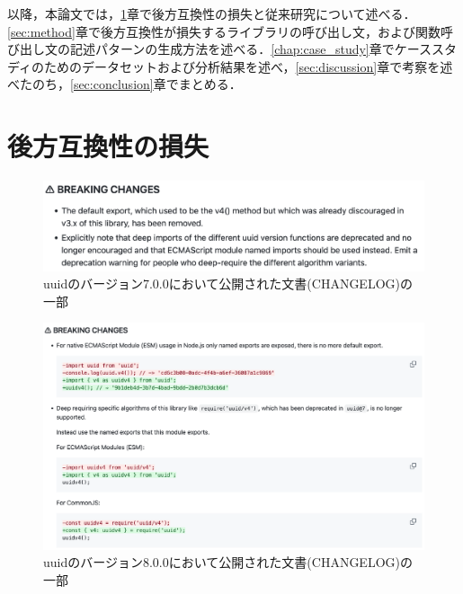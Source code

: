 \documentclass[11pt]{jreport}
\begin{document}
以降，本論文では，\ref{chap:intro}章で後方互換性の損失と従来研究について述べる．\ref{sec:method}章で後方互換性が損失するライブラリの呼び出し文，および関数呼び出し文の記述パターンの生成方法を述べる．\ref{chap:case_study}章でケーススタディのためのデータセットおよび分析結果を述べ，\ref{sec:discussion}章で考察を述べたのち，\ref{sec:conclusion}章でまとめる．




\chapter{後方互換性の損失}\label{chap:intro}

\begin{figure}[t]
\centerline{\includegraphics[width=0.9\linewidth]{BSthesis2024_Iida_fig/InsufficientDocumentation.pdf}}
\caption{uuidのバージョン7.0.0において公開された文書(CHANGELOG)の一部}
\label{fig:Insufficient_documentation}
\end{figure}

\begin{figure}[t]
\centerline{\includegraphics[width=0.9\linewidth]{BSthesis2024_Iida_fig/GoodDocumentation.pdf}}
\caption{uuidのバージョン8.0.0において公開された文書(CHANGELOG)の一部}
\label{fig:good_documentation}
\end{figure}
\end{document}
